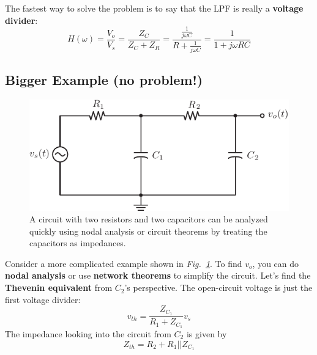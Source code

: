 The fastest way to solve the problem is to say that the LPF is really a \textbf{voltage divider}:
    \begin{equation}
        H(\omega ) = \frac{{{V_o}}}{{{V_s}}} = \frac{{{Z_C}}}{{{Z_C} + {Z_R}}} = \frac{{\frac{1}{{j\omega C}}}}{{R + \frac{1}{{j\omega C}}}} = \frac{1}{{1 + j\omega RC}}
    \end{equation}
\subsection{Bigger Example (no problem!)}
\begin{figure}[tb]
\centering
\includegraphics[angle=-0.0,scale=1]{mod1_3_7_rc_lpf2}
\caption{A circuit with two resistors and two capacitors can be analyzed quickly using nodal analysis or circuit theorems by treating the capacitors as impedances.}
\label{fig:bigexample}
\end{figure}
Consider a more complicated example shown in \emph{Fig.~\ref{fig:bigexample}}.  To find $v_o$, you can do \textbf{nodal analysis} or use \textbf{network theorems} to simplify the circuit.  Let's find the \textbf{Thevenin equivalent} from $C_2$'s perspective.  The open-circuit voltage is just the first voltage divider:
    \begin{equation}
        v_{th} = \frac{Z_{C_1}}{R_1 + Z_{C_1}} v_s 
    \end{equation}
The impedance looking into the circuit from $C_2$ is given by
    \begin{equation}
        Z_{th} = R_2 + R_1 || Z_{C_1}
    \end{equation}
